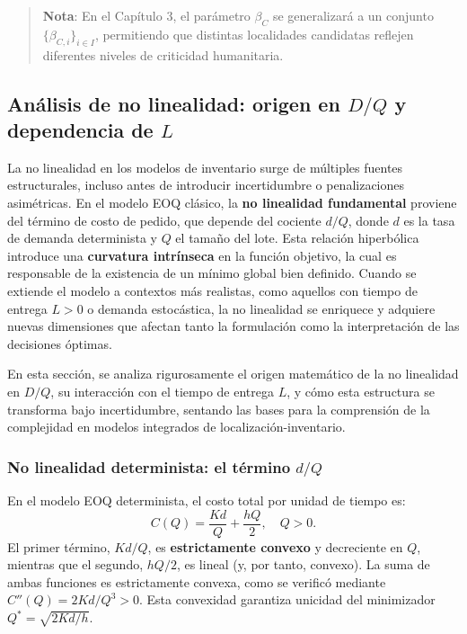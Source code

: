\documentclass[
  spanish,
  us-letterpaper,
]{scrreprt}
\numberwithin{equation}{section}
\begin{document}
\begin{quote}
\textbf{Nota}: En el Capítulo 3, el parámetro \(\beta_C\) se
generalizará a un conjunto \(\{\beta_{C,i}\}_{i \in I}\), permitiendo
que distintas localidades candidatas reflejen diferentes niveles de
criticidad humanitaria.
\end{quote}

\subsection{\texorpdfstring{Análisis de no linealidad: origen en \(D/Q\)
y dependencia de
\(L\)}{Análisis de no linealidad: origen en D/Q y dependencia de L}}\label{anuxe1lisis-de-no-linealidad-origen-en-dq-y-dependencia-de-l}

La no linealidad en los modelos de inventario surge de múltiples fuentes
estructurales, incluso antes de introducir incertidumbre o
penalizaciones asimétricas. En el modelo EOQ clásico, la \textbf{no
linealidad fundamental} proviene del término de costo de pedido, que
depende del cociente \(d/Q\), donde \(d\) es la tasa de demanda
determinista y \(Q\) el tamaño del lote. Esta relación hiperbólica
introduce una \textbf{curvatura intrínseca} en la función objetivo, la
cual es responsable de la existencia de un mínimo global bien definido.
Cuando se extiende el modelo a contextos más realistas, como aquellos
con tiempo de entrega \(L > 0\) o demanda estocástica, la no linealidad
se enriquece y adquiere nuevas dimensiones que afectan tanto la
formulación como la interpretación de las decisiones óptimas.

En esta sección, se analiza rigurosamente el origen matemático de la no
linealidad en \(D/Q\), su interacción con el tiempo de entrega \(L\), y
cómo esta estructura se transforma bajo incertidumbre, sentando las
bases para la comprensión de la complejidad en modelos integrados de
localización-inventario.

\subsubsection{\texorpdfstring{No linealidad determinista: el término
\(d/Q\)}{No linealidad determinista: el término d/Q}}\label{no-linealidad-determinista-el-tuxe9rmino-dq}

En el modelo EOQ determinista, el costo total por unidad de tiempo es:
\[
C(Q) = \frac{K d}{Q} + \frac{h Q}{2}, \quad Q > 0.
\] El primer término, \(K d / Q\), es \textbf{estrictamente convexo} y
decreciente en \(Q\), mientras que el segundo, \(h Q / 2\), es lineal
(y, por tanto, convexo). La suma de ambas funciones es estrictamente
convexa, como se verificó mediante \(C''(Q) = 2 K d / Q^3 > 0\). Esta
convexidad garantiza unicidad del minimizador
\(Q^* = \sqrt{2 K d / h}\).
\end{document}
